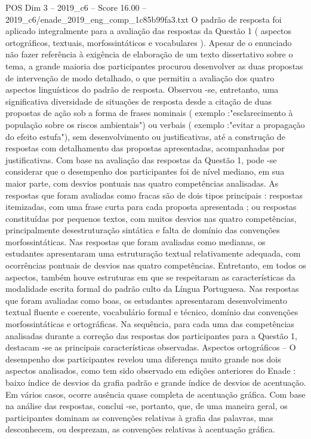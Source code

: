 \begin{textsample}{POS Dim 3 – 2019\_c6 – Score 16.00 – 2019\_c6/enade\_2019\_eng\_comp\_1c85b99fa3.txt}
O padrão de resposta foi aplicado integralmente para a avaliação das respostas da Questão 1 ( aspectos ortográficos, textuais, morfossintáticos e vocabulares ).
Apesar de o enunciado não fazer referência à exigência de elaboração de um texto dissertativo sobre o tema, a grande maioria dos participantes procurou desenvolver as duas propostas de intervenção de modo detalhado, o que permitiu a avaliação dos quatro aspectos linguísticos do padrão de resposta.
Observou -se, entretanto, uma significativa diversidade de situações de resposta desde a citação de duas propostas de ação sob a forma de frases nominais ( exemplo :"esclarecimento à população sobre os riscos ambientais") ou verbais ( exemplo :"evitar a propagação do efeito estufa"), sem desenvolvimento ou justificativas, até a construção de respostas com detalhamento das propostas apresentadas, acompanhadas por justificativas.
Com base na avaliação das respostas da Questão 1, pode -se considerar que o desempenho dos participantes foi de nível mediano, em sua maior parte, com desvios pontuais nas quatro competências analisadas.
As respostas que foram avaliadas como fracas são de dois tipos principais : respostas itemizadas, com uma frase curta para cada proposta apresentada ; ou respostas constituídas por pequenos textos, com muitos desvios nas quatro competências, principalmente desestruturação sintática e falta de domínio das convenções morfossintáticas.
Nas respostas que foram avaliadas como medianas, os estudantes apresentaram uma estruturação textual relativamente adequada, com ocorrências pontuais de desvios nas quatro competências.
Entretanto, em todos os aspectos, também houve estruturas em que se respeitaram as características da modalidade escrita formal do padrão culto da Língua Portuguesa.
Nas respostas que foram avaliadas como boas, os estudantes apresentaram desenvolvimento textual fluente e coerente, vocabulário formal e técnico, domínio das convenções morfossintáticas e ortográficas.
Na sequência, para cada uma das competências analisadas durante a correção das respostas dos participantes para a Questão 1, destacam -se as principais características observadas.
Aspectos ortográficos – O desempenho dos participantes revelou uma diferença muito grande nos dois aspectos analisados, como tem sido observado em edições anteriores do Enade : baixo índice de desvios da grafia padrão e grande índice de desvios de acentuação.
Em vários casos, ocorre ausência quase completa de acentuação gráfica.
Com base na análise das respostas, conclui -se, portanto, que, de uma maneira geral, os participantes dominam as convenções relativas à grafia das palavras, mas desconhecem, ou desprezam, as convenções relativas à acentuação gráfica.

\end{textsample}
